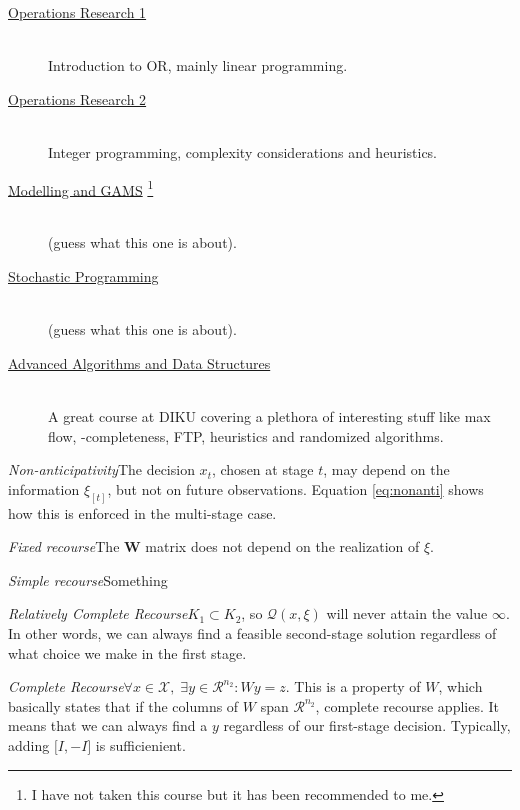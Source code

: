 \begin{description}
\item[\href{http://kurser.ku.dk/course/nmaa05087u/2013-2014}{Operations Research 1}]
\hfill\\ Introduction to OR, mainly linear programming.
\item[\href{http://kurser.ku.dk/course/nmaa09044u/2013-2014}{Operations Research 2}] 
\hfill\\ Integer programming, complexity considerations
and heuristics.
\item[\href{http://kurser.ku.dk/course/nmak13015u/2013-2014}{Modelling and GAMS}
\footnote{I have not taken this course but it has been recommended to me.}]
\hfill\\ (guess what this one is about).
\item[\href{http://kurser.ku.dk/course/nmaa13028u/2013-2014}{Stochastic Programming}]
\hfill\\ (guess what this one is about).
\item[\href{http://kurser.ku.dk/course/ndaa09023u/2013-2014}
{Advanced Algorithms and Data Structures}]
\hfill\\ A great course at DIKU covering
 a plethora of interesting stuff like max flow, \np-completeness, FTP,
 heuristics and randomized algorithms.
\end{description}


{\emph{Non-anticipativity}}{The decision $x_t$, chosen at stage $t$, may depend on the information 
$\xi_{[t]}$, but not on future observations. Equation \ref{eq:nonanti} shows how this is enforced
in the multi-stage case.}

{\emph{Fixed recourse}}{The $\bm{W}$ matrix does not depend on the realization of $\xi$.}

{\emph{Simple recourse}}{Something}

{\emph{Relatively Complete Recourse}}{$K_1 \subset K_2$, so $\mathcal{Q}(x,\xi)$ will never
attain the value $\infty$. In other words, we can always find a feasible second-stage solution
regardless of what choice we make in the first stage.}

{\emph{Complete Recourse}}{$\forall x \in \mathcal{X},\; \exists y \in \mathcal{R}^{n_2} : Wy = z$.
This is a property of $W$, which basically states that if the columns of $W$ span $\mathcal{R}^{n_2}$,
complete recourse applies. It means that we can always find a $y$ regardless of our first-stage
decision. Typically, adding $\big[I, -I\big]$ is sufficienient.}





